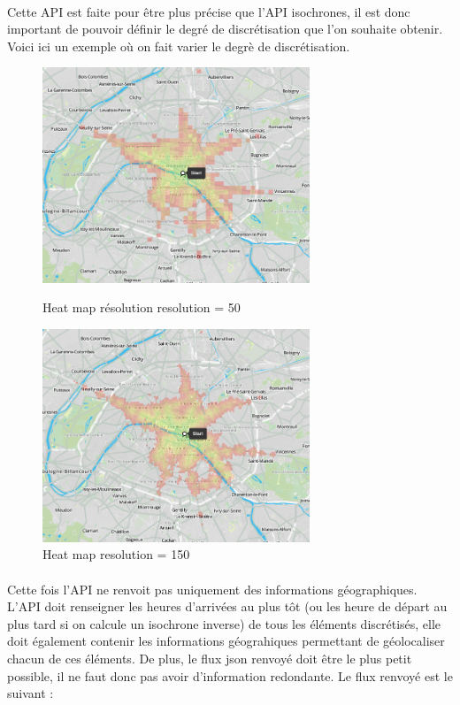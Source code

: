 \documentclass[a4paper]{report}
\begin{document}
\paragraph{} Cette API est faite pour être plus précise que l'API isochrones, il est donc important de pouvoir définir le degré de discrétisation que l'on souhaite obtenir. Voici ici un exemple où on fait varier le degrè de discrétisation.

\begin{figure}[H]
	\begin{minipage}[c]{.46\linewidth}
		\includegraphics[width=8cm]{image/heatmap_basse_reso}
       		\caption{Heat map résolution resolution = 50}
		\label{Heat map resolution = 50}
	\end{minipage} \hfill
	\begin{minipage}[c]{.46\linewidth}
		\includegraphics[width=8cm]{image/heatmap_haute_reso}
       		\caption{Heat map resolution = 150}
		\label{Heat map resolution = 150}
	\end{minipage}
\end{figure}

\paragraph{}Cette fois l'API ne renvoit pas uniquement des informations géographiques. L'API doit renseigner les heures d'arrivées au plus tôt (ou les heure de départ au plus tard si on calcule un isochrone inverse) de tous les éléments discrétisés, elle doit également contenir les informations géograhiques permettant de géolocaliser chacun de ces éléments. De plus, le flux json renvoyé doit être le plus petit possible, il ne faut donc pas avoir d'information redondante. Le flux renvoyé est le suivant :
\end{document}
